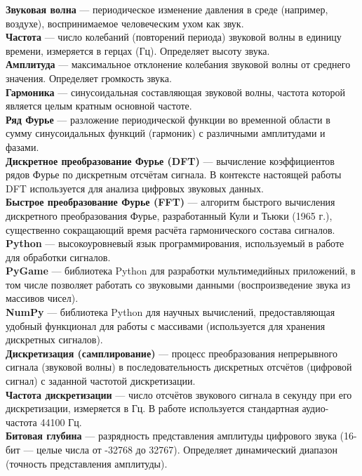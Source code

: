 \documentclass[bachelor, och, diploma]{SCWorks}
\begin{document}
\noindent \textbf{Звуковая волна} --- периодическое изменение давления в среде (например, воздухе), воспринимаемое человеческим ухом как звук.\\[0.5em]
\textbf{Частота} --- число колебаний (повторений периода) звуковой волны в единицу времени, измеряется в герцах (Гц). Определяет высоту звука.\\[0.5em]
\textbf{Амплитуда} --- максимальное отклонение колебания звуковой волны от среднего значения. Определяет громкость звука.\\[0.5em]
\textbf{Гармоника} --- синусоидальная составляющая звуковой волны, частота которой является целым кратным основной частоте.\\[0.5em]
\textbf{Ряд Фурье} --- разложение периодической функции во временной области в сумму синусоидальных функций (гармоник) с различными амплитудами и фазами.\\[0.5em]
\textbf{Дискретное преобразование Фурье (DFT)} --- вычисление коэффициентов рядов Фурье по дискретным отсчётам сигнала. В контексте настоящей работы DFT используется для анализа цифровых звуковых данных.\\[0.5em]
\textbf{Быстрое преобразование Фурье (FFT)} --- алгоритм быстрого вычисления дискретного преобразования Фурье, разработанный Кули и Тьюки (1965 г.), существенно сокращающий время расчёта гармонического состава сигналов.\\[0.5em]
\textbf{Python} --- высокоуровневый язык программирования, используемый в работе для обработки сигналов.\\[0.5em]
\textbf{PyGame} --- библиотека Python для разработки мультимедийных приложений, в том числе позволяет работать со звуковыми данными (воспроизведение звука из массивов чисел).\\[0.5em]
\textbf{NumPy} --- библиотека Python для научных вычислений, предоставляющая удобный функционал для работы с массивами (используется для хранения дискретных сигналов).\\[0.5em]
\textbf{Дискретизация (самплирование)} --- процесс преобразования непрерывного сигнала (звуковой волны) в последовательность дискретных отсчётов (цифровой сигнал) с заданной частотой дискретизации.\\[0.5em]
\textbf{Частота дискретизации} --- число отсчётов звукового сигнала в секунду при его дискретизации, измеряется в Гц. В работе используется стандартная аудио-частота 44100 Гц.\\[0.5em]
\textbf{Битовая глубина} --- разрядность представления амплитуды цифрового звука (16-бит --- целые числа от -32768 до 32767). Определяет динамический диапазон (точность представления амплитуды).
\end{document}
